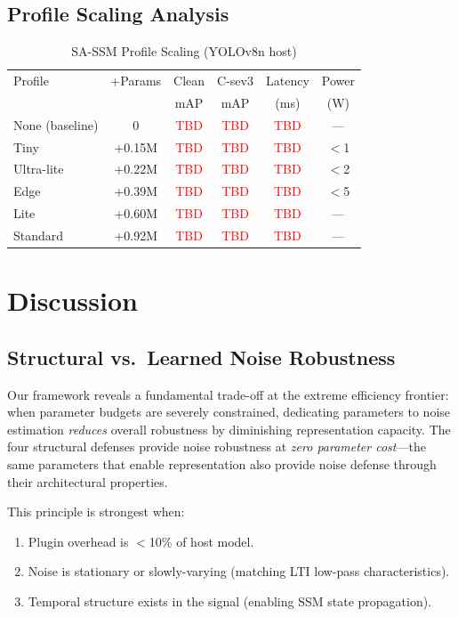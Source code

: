 \documentclass[conference]{IEEEtran}
\newcommand{\tbd}[1]{\textcolor{red}{#1}}
\begin{document}
\subsection{Profile Scaling Analysis}

\begin{table}[t]
\centering
\caption{SA-SSM Profile Scaling (YOLOv8n host)}
\label{tab:scaling}
\small
\begin{tabular}{@{}lccccc@{}}
\toprule
Profile & +Params & Clean & C-sev3 & Latency & Power \\
& & mAP & mAP & (ms) & (W) \\
\midrule
None (baseline) & 0 & \tbd{TBD} & \tbd{TBD} & \tbd{TBD} & --- \\
Tiny & +0.15M & \tbd{TBD} & \tbd{TBD} & \tbd{TBD} & $<$1 \\
Ultra-lite & +0.22M & \tbd{TBD} & \tbd{TBD} & \tbd{TBD} & $<$2 \\
Edge & +0.39M & \tbd{TBD} & \tbd{TBD} & \tbd{TBD} & $<$5 \\
Lite & +0.60M & \tbd{TBD} & \tbd{TBD} & \tbd{TBD} & --- \\
Standard & +0.92M & \tbd{TBD} & \tbd{TBD} & \tbd{TBD} & --- \\
\bottomrule
\end{tabular}
\end{table}

\section{Discussion}

\subsection{Structural vs.\ Learned Noise Robustness}

Our framework reveals a fundamental trade-off at the extreme efficiency frontier: when parameter budgets are severely constrained, dedicating parameters to noise estimation \emph{reduces} overall robustness by diminishing representation capacity. The four structural defenses provide noise robustness at \emph{zero parameter cost}---the same parameters that enable representation also provide noise defense through their architectural properties.

This principle is strongest when:
\begin{enumerate}
\item Plugin overhead is $<$10\% of host model.
\item Noise is stationary or slowly-varying (matching LTI low-pass characteristics).
\item Temporal structure exists in the signal (enabling SSM state propagation).
\end{enumerate}
\end{document}
